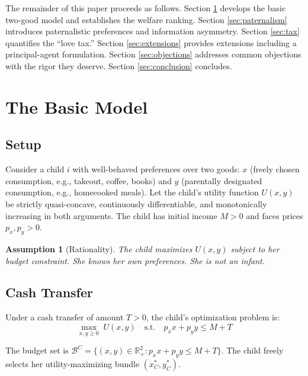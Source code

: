 \documentclass[AER]{AEA}
\newtheorem{assumption}{Assumption}
\begin{document}
The remainder of this paper proceeds as follows. Section \ref{sec:model} develops the basic two-good model and establishes the welfare ranking. Section \ref{sec:paternalism} introduces paternalistic preferences and information asymmetry. Section \ref{sec:tax} quantifies the ``love tax.'' Section \ref{sec:extensions} provides extensions including a principal-agent formulation. Section \ref{sec:objections} addresses common objections with the rigor they deserve. Section \ref{sec:conclusion} concludes.

\section{The Basic Model}\label{sec:model}

\subsection{Setup}

Consider a child $i$ with well-behaved preferences over two goods: $x$ (freely chosen consumption, e.g., takeout, coffee, books) and $y$ (parentally designated consumption, e.g., homecooked meals). Let the child's utility function $U(x,y)$ be strictly quasi-concave, continuously differentiable, and monotonically increasing in both arguments. The child has initial income $M > 0$ and faces prices $p_x, p_y > 0$.

\begin{assumption}[Rationality]\label{as:rational}
The child maximizes $U(x,y)$ subject to her budget constraint. She knows her own preferences. She is not an infant.
\end{assumption}

\subsection{Cash Transfer}

Under a cash transfer of amount $T > 0$, the child's optimization problem is:
\begin{equation}\label{eq:cash}
\max_{x,y \geq 0} \; U(x,y) \quad \text{s.t.} \quad p_x x + p_y y \leq M + T
\end{equation}

The budget set is $\mathcal{B}^{C} = \{(x,y) \in \mathbb{R}^2_+ : p_x x + p_y y \leq M + T\}$. The child freely selects her utility-maximizing bundle $(x^*_C, y^*_C)$.
\end{document}
